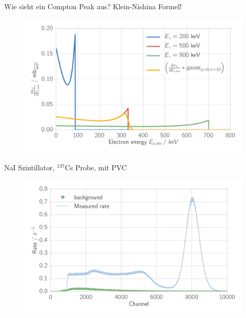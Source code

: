 \documentclass[xcolor=x11names,compress]{beamer}
\renewcommand{\(}{\begin{columns}}
\renewcommand{\)}{\end{columns}}
\newcommand{\<}[1]{\begin{column}{#1}}
\renewcommand{\>}{\end{column}}
\begin{document}
\begin{frame}[t]{Wie sieht ein Compton Peak aus? Klein-Nishina Formel!}
\begin{figure}[htpb]
    \centering
    \includegraphics[width=1.0\linewidth]{../analysis/figures/theory_dsde}
\label{fig:theory_kn}
\end{figure}
\end{frame}

\begin{frame}[t]{NaI Szintillator, $^{137}$Cs Probe, mit PVC}
 \begin{figure}[htpb]
    \centering
    \includegraphics[width=1.0\linewidth]{../analysis/figures/histo_na_137cs_nolegend}
    \label{fig:histo_na_137cs}
\end{figure}
\end{frame}
\end{document}
